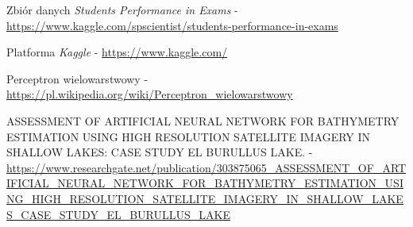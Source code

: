 \documentclass[12pt]{article}
\begin{document}
\pagebreak

\begin{thebibliography}{9}

Zbiór danych  \textit{Students Performance in Exams} - \url{https://www.kaggle.com/spscientist/students-performance-in-exams}

Platforma \textit{Kaggle} - \url{https://www.kaggle.com/}

Perceptron wielowarstwowy - \url{https://pl.wikipedia.org/wiki/Perceptron_wielowarstwowy}

ASSESSMENT OF ARTIFICIAL NEURAL NETWORK FOR BATHYMETRY ESTIMATION USING HIGH RESOLUTION SATELLITE IMAGERY IN SHALLOW LAKES: CASE STUDY EL BURULLUS LAKE. - \url{https://www.researchgate.net/publication/303875065_ASSESSMENT_OF_ARTIFICIAL_NEURAL_NETWORK_FOR_BATHYMETRY_ESTIMATION_USING_HIGH_RESOLUTION_SATELLITE_IMAGERY_IN_SHALLOW_LAKES_CASE_STUDY_EL_BURULLUS_LAKE}

\end{thebibliography}
\end{document}

